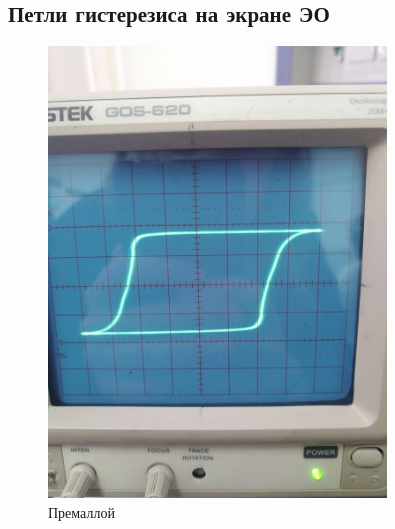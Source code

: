 \documentclass[14pt,a4paper]{article}
\begin{document}
\subsection*{Петли гистерезиса на экране ЭО}
\begin{figure}[H]
  \includegraphics*[width=0.8\textwidth]{2023-09-30-18-30-19.png}
  \caption{Премаллой}
\end{figure}
\end{document}
